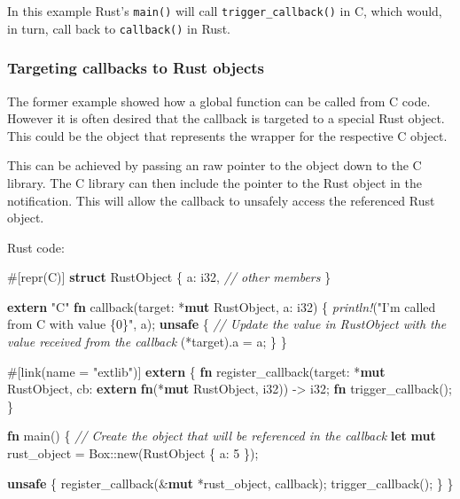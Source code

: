 \documentclass[a4paper,]{book}
\newenvironment{Shaded}{\begin{snugshade}}{\end{snugshade}}
\newcommand{\KeywordTok}[1]{\textcolor[rgb]{0.13,0.29,0.53}{\textbf{{#1}}}}
\newcommand{\DataTypeTok}[1]{\textcolor[rgb]{0.13,0.29,0.53}{{#1}}}
\newcommand{\DecValTok}[1]{\textcolor[rgb]{0.00,0.00,0.81}{{#1}}}
\newcommand{\StringTok}[1]{\textcolor[rgb]{0.31,0.60,0.02}{{#1}}}
\newcommand{\CommentTok}[1]{\textcolor[rgb]{0.56,0.35,0.01}{\textit{{#1}}}}
\newcommand{\PreprocessorTok}[1]{\textcolor[rgb]{0.56,0.35,0.01}{\textit{{#1}}}}
\newcommand{\AttributeTok}[1]{\textcolor[rgb]{0.77,0.63,0.00}{{#1}}}
\newcommand{\NormalTok}[1]{{#1}}
\begin{document}
In this example Rust's \texttt{main()} will call
\texttt{trigger\_callback()} in C, which would, in turn, call back to
\texttt{callback()} in Rust.

\subsubsection{Targeting callbacks to Rust
objects}\label{targeting-callbacks-to-rust-objects}

The former example showed how a global function can be called from C
code. However it is often desired that the callback is targeted to a
special Rust object. This could be the object that represents the
wrapper for the respective C object.

This can be achieved by passing an raw pointer to the object down to the
C library. The C library can then include the pointer to the Rust object
in the notification. This will allow the callback to unsafely access the
referenced Rust object.

Rust code:

\begin{Shaded}
\begin{Highlighting}[]
\AttributeTok{#[}\NormalTok{repr}\AttributeTok{(}\NormalTok{C}\AttributeTok{)]}
\KeywordTok{struct} \NormalTok{RustObject \{}
    \NormalTok{a: }\DataTypeTok{i32}\NormalTok{,}
    \CommentTok{// other members}
\NormalTok{\}}

\KeywordTok{extern} \StringTok{"C"} \KeywordTok{fn} \NormalTok{callback(target: *}\KeywordTok{mut} \NormalTok{RustObject, a: }\DataTypeTok{i32}\NormalTok{) \{}
    \PreprocessorTok{println!}\NormalTok{(}\StringTok{"I'm called from C with value \{0\}"}\NormalTok{, a);}
    \KeywordTok{unsafe} \NormalTok{\{}
        \CommentTok{// Update the value in RustObject with the value received from the callback}
        \NormalTok{(*target).a = a;}
    \NormalTok{\}}
\NormalTok{\}}

\AttributeTok{#[}\NormalTok{link}\AttributeTok{(}\NormalTok{name }\AttributeTok{=} \StringTok{"extlib"}\AttributeTok{)]}
\KeywordTok{extern} \NormalTok{\{}
   \KeywordTok{fn} \NormalTok{register_callback(target: *}\KeywordTok{mut} \NormalTok{RustObject,}
                        \NormalTok{cb: }\KeywordTok{extern} \KeywordTok{fn}\NormalTok{(*}\KeywordTok{mut} \NormalTok{RustObject, }\DataTypeTok{i32}\NormalTok{)) -> }\DataTypeTok{i32}\NormalTok{;}
   \KeywordTok{fn} \NormalTok{trigger_callback();}
\NormalTok{\}}

\KeywordTok{fn} \NormalTok{main() \{}
    \CommentTok{// Create the object that will be referenced in the callback}
    \KeywordTok{let} \KeywordTok{mut} \NormalTok{rust_object = }\DataTypeTok{Box}\NormalTok{::new(RustObject \{ a: }\DecValTok{5} \NormalTok{\});}

    \KeywordTok{unsafe} \NormalTok{\{}
        \NormalTok{register_callback(&}\KeywordTok{mut} \NormalTok{*rust_object, callback);}
        \NormalTok{trigger_callback();}
    \NormalTok{\}}
\NormalTok{\}}
\end{Highlighting}
\end{Shaded}
\end{document}
